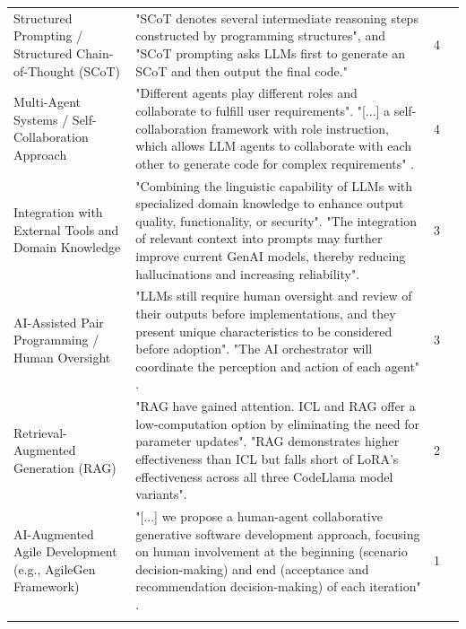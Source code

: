 {\begin{longtable}{>{\raggedright\arraybackslash} p{3cm} p{9.3cm} p{0.2cm} p{1.8cm}}
Structured Prompting / Structured Chain-of-Thought (SCoT) & "SCoT denotes several intermediate reasoning steps constructed by programming structures", and "SCoT prompting asks LLMs first to generate an SCoT and then output the final code." \cite{Li:2025sc} & 4 & \cite{Li:2025sc, Han:2025mg, Jabrw:2025ss, Kim:2025is} \\ \addlinespace

Multi-Agent Systems / Self-Collaboration Approach & "Different agents play different roles and collaborate to fulfill user requirements". "[...] a self-collaboration framework with role instruction, which allows LLM agents to collaborate with each other to generate code for complex requirements" \cite{Wang:2025rs, Dong:2024sc}. & 4 & \cite{Wang:2025rs, Dong:2024sc, Banh:2025cf, Bai:2025ci} \\ \addlinespace

Integration with External Tools and Domain Knowledge & "Combining the linguistic capability of LLMs with specialized domain knowledge to enhance output quality, functionality, or security". "The integration of relevant context into prompts may further improve current GenAI models, thereby reducing hallucinations and increasing reliability". \cite{Wang:2025rs, Banh:2025cf} & 3 & \cite{Wang:2025rs, Banh:2025cf, Zhang:2025ea, Ahmed:2025ai} \\ \addlinespace

AI-Assisted Pair Programming / Human Oversight & "LLMs still require human oversight and review of their outputs before implementations, and they present unique characteristics to be considered before adoption". "The AI orchestrator will coordinate the perception and action of each agent" \cite{Kim:2025ao, Terragni:2025fa}. & 3 & \cite{Kim:2025ao, Terragni:2025fa, Zamfiroiu:2025ec}\\ \addlinespace

Retrieval-Augmented Generation (RAG) & "RAG have gained attention. ICL and RAG offer a low-computation option by eliminating the need for parameter updates". "RAG demonstrates higher effectiveness than ICL but falls short of LoRA’s effectiveness across all three CodeLlama model variants". \cite{Weyssow:2025ep} & 2 & \cite{Weyssow:2025ep, Chen:2025es} \\ \addlinespace

AI-Augmented Agile Development (e.g., AgileGen Framework) & "[...] we propose a human-agent collaborative generative software development approach, focusing on human involvement at the beginning (scenario decision-making) and end (acceptance and recommendation decision-making) of each iteration" \cite{Zhang:2025ea}. & 1 & \cite{Zhang:2025ea} \\ \addlinespace


\end{longtable}}
